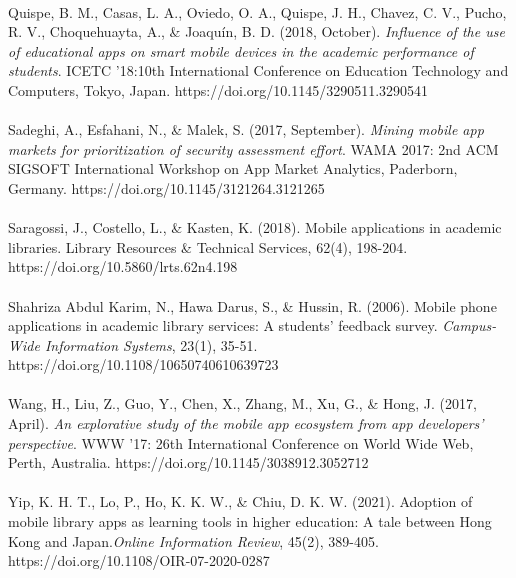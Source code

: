\paragraph{}
Quispe, B. M., Casas, L. A., Oviedo, O. A., Quispe, J. H., Chavez, C. V., Pucho, R. V., Choquehuayta, A., & Joaquín, B. D. (2018, October). \textit{Influence of the use of educational apps on smart mobile devices in the academic performance of students}. ICETC '18:10th International Conference on Education Technology and Computers, Tokyo, Japan. https://doi.org/10.1145/3290511.3290541

\paragraph{}
Sadeghi, A., Esfahani, N., & Malek, S. (2017, September). \textit{Mining mobile app markets for prioritization of security assessment effort}. WAMA 2017: 2nd ACM SIGSOFT International Workshop on App Market Analytics, Paderborn, Germany. https://doi.org/10.1145/3121264.3121265

\paragraph{}
Saragossi, J., Costello, L., & Kasten, K.   (2018).   Mobile applications in academic libraries. Library Resources & Technical Services, 62(4), 198-204. https://doi.org/10.5860/lrts.62n4.198

\paragraph{}
Shahriza Abdul Karim, N., Hawa Darus, S., & Hussin, R. (2006). Mobile phone applications in academic library services: A students' feedback survey. \textit{Campus-Wide Information Systems}, 23(1), 35-51. https://doi.org/10.1108/10650740610639723 

\paragraph{}
Wang, H., Liu, Z., Guo, Y., Chen, X., Zhang, M., Xu, G., & Hong, J. (2017, April). \textit{An explorative study of the mobile app ecosystem from app developers' perspective}. WWW '17: 26th International Conference on World Wide Web, Perth, Australia. https://doi.org/10.1145/3038912.3052712

\paragraph{}
Yip, K. H. T., Lo, P., Ho, K. K. W., & Chiu, D. K. W. (2021). Adoption of mobile library apps as learning tools in higher education: A tale between Hong Kong and Japan.\textit{Online Information Review}, 45(2), 389-405. https://doi.org/10.1108/OIR-07-2020-0287 